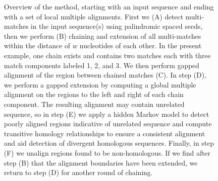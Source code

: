 \documentclass[9.5pt,journal,final,finalsubmission,twocolumn]{IEEEtran}
\begin{document}
\begin{figure}[t!]
\begin{center}
\end{center}
\caption
{Overview of the method, starting with an input sequence and ending
with a set of local multiple alignments. First we (A) detect
multi-matches in the input sequence(s) using palindromic spaced seeds,
then we perform (B) chaining and extension of all multi-matches within
the distance of $w$ nucleotides of each other.  In the present example, one chain exists and
contains two matches each with three match components labeled 1, 2,
and 3.  We then perform gapped alignment of the region between chained
matches (C).  In step (D), we perform a gapped extension by computing
a global multiple alignment on the regions to the left and right of
each chain component.  The resulting alignment may contain unrelated
sequence, so in step (E) we apply a hidden Markov model to detect
poorly aligned regions indicative of unrelated sequence and
compute transitive homology relationships to ensure a consistent
alignment and aid detection of divergent homologous sequences.
Finally, in step (F) we unalign regions found to be non-homologous.
If we find after step (B) that the alignment boundaries have been
extended, we return to step (D) for another round of chaining.}
\label{fig-main}
\end{figure}
\end{document}
